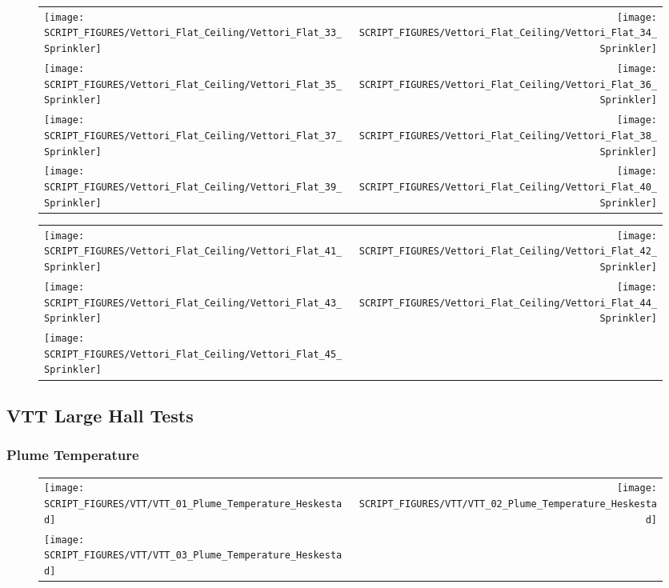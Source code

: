 \begin{figure}[p]
\begin{tabular*}{\textwidth}{l@{\extracolsep{\fill}}r}
\texttt{[image: SCRIPT\_FIGURES/Vettori\_Flat\_Ceiling/Vettori\_Flat\_33\_Sprinkler]} &
\texttt{[image: SCRIPT\_FIGURES/Vettori\_Flat\_Ceiling/Vettori\_Flat\_34\_Sprinkler]} \\
\texttt{[image: SCRIPT\_FIGURES/Vettori\_Flat\_Ceiling/Vettori\_Flat\_35\_Sprinkler]} &
\texttt{[image: SCRIPT\_FIGURES/Vettori\_Flat\_Ceiling/Vettori\_Flat\_36\_Sprinkler]} \\
\texttt{[image: SCRIPT\_FIGURES/Vettori\_Flat\_Ceiling/Vettori\_Flat\_37\_Sprinkler]} &
\texttt{[image: SCRIPT\_FIGURES/Vettori\_Flat\_Ceiling/Vettori\_Flat\_38\_Sprinkler]} \\
\texttt{[image: SCRIPT\_FIGURES/Vettori\_Flat\_Ceiling/Vettori\_Flat\_39\_Sprinkler]} &
\texttt{[image: SCRIPT\_FIGURES/Vettori\_Flat\_Ceiling/Vettori\_Flat\_40\_Sprinkler]}
\end{tabular*}
\end{figure}

\begin{figure}[p]
\begin{tabular*}{\textwidth}{l@{\extracolsep{\fill}}r}
\texttt{[image: SCRIPT\_FIGURES/Vettori\_Flat\_Ceiling/Vettori\_Flat\_41\_Sprinkler]} &
\texttt{[image: SCRIPT\_FIGURES/Vettori\_Flat\_Ceiling/Vettori\_Flat\_42\_Sprinkler]} \\
\texttt{[image: SCRIPT\_FIGURES/Vettori\_Flat\_Ceiling/Vettori\_Flat\_43\_Sprinkler]} &
\texttt{[image: SCRIPT\_FIGURES/Vettori\_Flat\_Ceiling/Vettori\_Flat\_44\_Sprinkler]} \\
\texttt{[image: SCRIPT\_FIGURES/Vettori\_Flat\_Ceiling/Vettori\_Flat\_45\_Sprinkler]}
\end{tabular*}
\end{figure}

\clearpage

\subsection{VTT Large Hall Tests}

\subsubsection{Plume Temperature}

\begin{figure}[p]
\begin{tabular*}{\textwidth}{l@{\extracolsep{\fill}}r}
\texttt{[image: SCRIPT\_FIGURES/VTT/VTT\_01\_Plume\_Temperature\_Heskestad]} &
\texttt{[image: SCRIPT\_FIGURES/VTT/VTT\_02\_Plume\_Temperature\_Heskestad]} \\
\texttt{[image: SCRIPT\_FIGURES/VTT/VTT\_03\_Plume\_Temperature\_Heskestad]}
\end{tabular*}
\end{figure}

